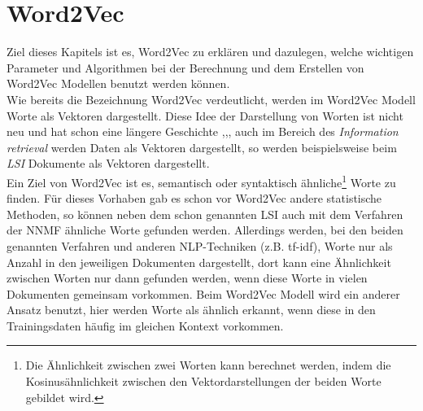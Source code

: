 \documentclass[12pt,a4paper]{report}
\begin{document}
\chapter{Word2Vec}
Ziel dieses Kapitels ist es, Word2Vec zu erklären und dazulegen, welche wichtigen Parameter und Algorithmen bei der Berechnung und dem Erstellen von Word2Vec Modellen benutzt werden können.\\
Wie bereits die Bezeichnung Word2Vec verdeutlicht, werden im Word2Vec Modell Worte als Vektoren dargestellt. Diese Idee der Darstellung von Worten ist nicht neu und hat schon eine längere Geschichte \cite{Hinton86},\cite{williams1986learning},\cite{elman1990finding}, auch im Bereich des \textit{Information retrieval} werden Daten als Vektoren dargestellt, so werden beispielsweise beim \textit{LSI} \cite{deerwester1990indexing} Dokumente als Vektoren dargestellt. \\
Ein Ziel von Word2Vec ist es, semantisch oder syntaktisch ähnliche\footnote{Die Ähnlichkeit zwischen zwei Worten kann berechnet werden, indem die Kosinusähnlichkeit zwischen den Vektordarstellungen der beiden Worte gebildet wird.} Worte zu finden. Für dieses Vorhaben gab es schon vor Word2Vec andere statistische Methoden, so können neben dem schon genannten LSI auch mit dem Verfahren der NNMF ähnliche Worte gefunden werden. Allerdings werden, bei den beiden genannten Verfahren und anderen NLP-Techniken (z.B. tf-idf), Worte nur als Anzahl in den jeweiligen Dokumenten dargestellt, dort kann eine Ähnlichkeit zwischen Worten nur dann gefunden werden, wenn diese Worte in vielen Dokumenten gemeinsam vorkommen. Beim Word2Vec Modell wird ein anderer Ansatz benutzt, hier werden Worte als ähnlich erkannt, wenn diese in den Trainingsdaten häufig im gleichen Kontext vorkommen.\\
\end{document}
